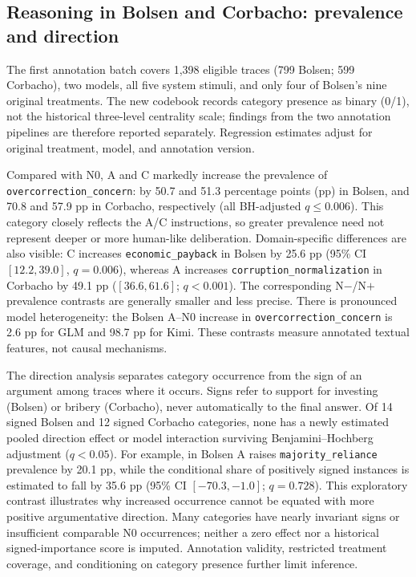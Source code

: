 \subsection{Reasoning in Bolsen and Corbacho: prevalence and direction}

The first annotation batch covers 1,398 eligible traces (799 Bolsen; 599 Corbacho), two models, all five system stimuli, and only four of Bolsen's nine original treatments. The new codebook records category presence as binary (0/1), not the historical three-level centrality scale; findings from the two annotation pipelines are therefore reported separately. Regression estimates adjust for original treatment, model, and annotation version.

Compared with N0, A and C markedly increase the prevalence of \texttt{overcorrection\_concern}: by 50.7 and 51.3 percentage points (pp) in Bolsen, and 70.8 and 57.9 pp in Corbacho, respectively (all BH-adjusted $q\leq0.006$). This category closely reflects the A/C instructions, so greater prevalence need not represent deeper or more human-like deliberation. Domain-specific differences are also visible: C increases \texttt{economic\_payback} in Bolsen by 25.6 pp (95\% CI $[12.2,39.0]$, $q=0.006$), whereas A increases \texttt{corruption\_normalization} in Corbacho by 49.1 pp ($[36.6,61.6]$; $q<0.001$). The corresponding N$-$/N$+$ prevalence contrasts are generally smaller and less precise. There is pronounced model heterogeneity: the Bolsen A--N0 increase in \texttt{overcorrection\_concern} is 2.6 pp for GLM and 98.7 pp for Kimi. These contrasts measure annotated textual features, not causal mechanisms.

The direction analysis separates category occurrence from the sign of an argument among traces where it occurs. Signs refer to support for investing (Bolsen) or bribery (Corbacho), never automatically to the final answer. Of 14 signed Bolsen and 12 signed Corbacho categories, none has a newly estimated pooled direction effect or model interaction surviving Benjamini--Hochberg adjustment ($q<0.05$). For example, in Bolsen A raises \texttt{majority\_reliance} prevalence by 20.1 pp, while the conditional share of positively signed instances is estimated to fall by 35.6 pp (95\% CI $[-70.3,-1.0]$; $q=0.728$). This exploratory contrast illustrates why increased occurrence cannot be equated with more positive argumentative direction. Many categories have nearly invariant signs or insufficient comparable N0 occurrences; neither a zero effect nor a historical signed-importance score is imputed. Annotation validity, restricted treatment coverage, and conditioning on category presence further limit inference.

